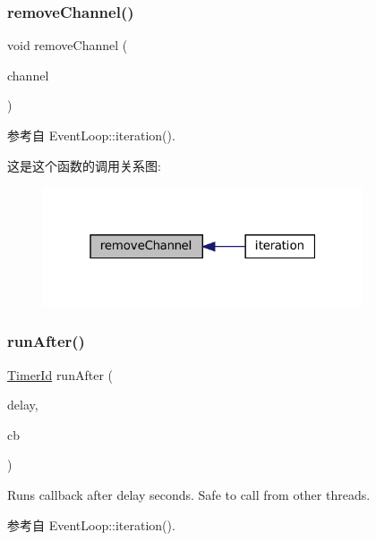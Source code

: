 \subsubsection{\texorpdfstring{remove\+Channel()}{removeChannel()}}
{\footnotesize\ttfamily void remove\+Channel (\begin{DoxyParamCaption}\item[{\hyperlink{classmuduo_1_1net_1_1Channel}{Channel} $\ast$}]{channel }\end{DoxyParamCaption})}



参考自 Event\+Loop\+::iteration().

这是这个函数的调用关系图\+:
\nopagebreak
\begin{figure}[H]
\begin{center}
\leavevmode
\includegraphics[width=268pt]{classmuduo_1_1net_1_1EventLoop_ab10f76c92cb5269f8296e5b3e4dd0ef9_icgraph}
\end{center}
\end{figure}
\mbox{\label{classmuduo_1_1net_1_1EventLoop_af7e9c28bac049d58cc6a8e5040e1ddb2}} 
\subsubsection{\texorpdfstring{run\+After()}{runAfter()}}
{\footnotesize\ttfamily \hyperlink{classmuduo_1_1net_1_1TimerId}{Timer\+Id} run\+After (\begin{DoxyParamCaption}\item[{double}]{delay,  }\item[{\hyperlink{namespacemuduo_1_1net_ad4bd8788fd4c609b90c78920572bec50}{Timer\+Callback}}]{cb }\end{DoxyParamCaption})}

Runs callback after {\ttfamily delay} seconds. Safe to call from other threads. 

参考自 Event\+Loop\+::iteration().


